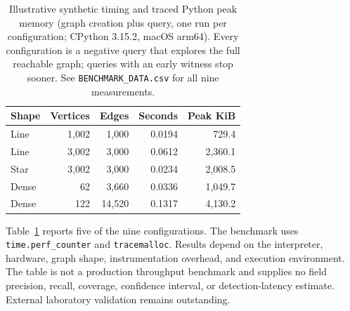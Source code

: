 \documentclass[11pt,letterpaper]{article}
\newcommand{\code}[1]{\texttt{#1}}
\begin{document}
\begin{table}[htbp]
\centering\small
\caption{Illustrative synthetic timing and traced Python peak memory (graph creation plus query, one run per configuration; CPython 3.15.2, macOS arm64). Every configuration is a negative query that explores the full reachable graph; queries with an early witness stop sooner. See \code{BENCHMARK\_DATA.csv} for all nine measurements.}
\label{tab:benchmark}
\begin{tabular}{@{}lrrrr@{}}
\toprule
\textbf{Shape} & \textbf{Vertices} & \textbf{Edges} & \textbf{Seconds} & \textbf{Peak KiB}\\
\midrule
Line & 1,002 & 1,000 & 0.0194 & 729.4\\
Line & 3,002 & 3,000 & 0.0612 & 2,360.1\\
Star & 3,002 & 3,000 & 0.0234 & 2,008.5\\
Dense & 62 & 3,660 & 0.0336 & 1,049.7\\
Dense & 122 & 14,520 & 0.1317 & 4,130.2\\
\bottomrule
\end{tabular}
\end{table}

Table~\ref{tab:benchmark} reports five of the nine configurations. The benchmark uses \code{time.perf\_counter} and \code{tracemalloc}. Results depend on the interpreter, hardware, graph shape, instrumentation overhead, and execution environment. The table is not a production throughput benchmark and supplies no field precision, recall, coverage, confidence interval, or detection-latency estimate. External laboratory validation remains outstanding.
\end{document}
